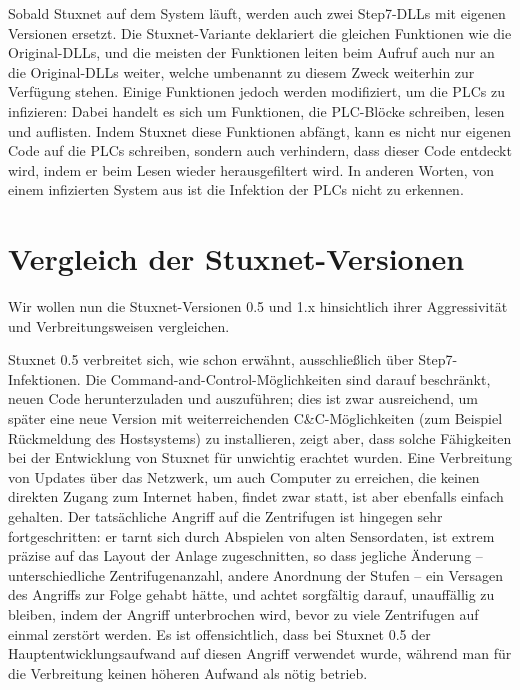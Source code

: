 \documentclass[a4paper]{article}
\begin{document}
Sobald Stuxnet auf dem System läuft, werden auch zwei Step7-DLLs mit eigenen Versionen ersetzt.
Die Stuxnet-Variante deklariert die gleichen Funktionen wie die Original-DLLs,
und die meisten der Funktionen leiten beim Aufruf auch nur an die Original-DLLs weiter,
welche umbenannt zu diesem Zweck weiterhin zur Verfügung stehen.
Einige Funktionen jedoch werden modifiziert, um die PLCs zu infizieren:
Dabei handelt es sich um Funktionen, die PLC-Blöcke schreiben, lesen und auflisten.
Indem Stuxnet diese Funktionen abfängt, kann es nicht nur eigenen Code auf die PLCs schreiben,
sondern auch verhindern, dass dieser Code entdeckt wird, indem er beim Lesen wieder herausgefiltert wird.
In anderen Worten, von einem infizierten System aus ist die Infektion der PLCs nicht zu erkennen.


\section{Vergleich der Stuxnet-Versionen}

Wir wollen nun die Stuxnet-Versionen 0.5 und 1.x hinsichtlich ihrer Aggressivität und Verbreitungsweisen vergleichen.

Stuxnet 0.5 verbreitet sich, wie schon erwähnt, ausschließlich über Step7-Infektionen.
Die Command-and-Control-Möglichkeiten sind darauf beschränkt, neuen Code herunterzuladen und auszuführen;
dies ist zwar ausreichend, um später eine neue Version mit weiterreichenden C\&C-Möglichkeiten (zum Beispiel Rück\-mel\-dung des Hostsystems) zu installieren,
zeigt aber, dass solche Fähigkeiten bei der Entwicklung von Stuxnet für unwichtig erachtet wurden.
Eine Verbreitung von Updates über das Netzwerk, um auch Computer zu erreichen, die keinen direkten Zugang zum Internet haben,
findet zwar statt, ist aber ebenfalls einfach gehalten.
Der tatsächliche Angriff auf die Zentrifugen ist hingegen sehr fortgeschritten:
er tarnt sich durch Abspielen von alten Sensordaten,
ist extrem präzise auf das Layout der Anlage zugeschnitten, so dass jegliche Änderung – unterschiedliche Zentrifugenanzahl, andere Anordnung der Stufen – ein Versagen des Angriffs zur Folge gehabt hätte,
und achtet sorgfältig darauf, unauffällig zu bleiben, indem der Angriff unterbrochen wird, bevor zu viele Zentrifugen auf einmal zerstört werden.
Es ist offensichtlich, dass bei Stuxnet 0.5 der Hauptentwicklungsaufwand auf diesen Angriff verwendet wurde,
während man für die Verbreitung keinen höheren Aufwand als nötig betrieb.
\end{document}
